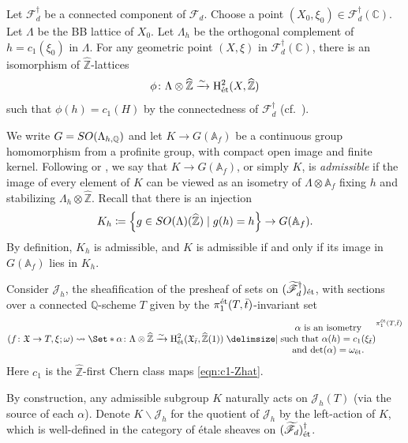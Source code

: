\documentclass[11pt,reqno,oneside]{amsart}
\numberwithin{equation}{section}
\theoremstyle{definition}
\newcommand{\SO}{{\rm SO}}
\DeclareMathOperator{\et}{\Acute{e}t}
\newcommand{\scF}{\mathscr{F}}
\newcommand\rH{\mathrm{H}}
\newcommand{\CC}{\mathbb{C}}
\newcommand{\QQ}{\mathbb{Q}}
\newcommand{\ZZ}{\mathbb{Z}}
\newcommand{\fX}{\mathfrak{X}}
\begin{document}
Let $\scF_{d}^{\dag}$ be a connected component of $\scF_d$. Choose a point $(X_0,\xi_0) \in \scF_d^{\dag}(\CC)$.
Let $\Lambda$ be the BB lattice of $X_0$. Let $\Lambda_{h}$ be the orthogonal complement of $h= c_1(\xi_0)$ in $\Lambda$.
For any geometric point $(X,\xi)$ in $\scF_{d}^{\dag}(\CC)$, there is an isomorphism of $\widehat{\ZZ}$-lattices
\[
\phi \colon \Lambda \otimes \widehat{\ZZ} \xrightarrow{\sim} \rH^2_{\et}(X, \widehat{\ZZ})  
\]
such that $\phi(h) = c_1(H)$ by the connectedness of $\scF_d^\dag$ (cf.~\cite[Lemma 4.5.1]{BindtThesis}). 


We write $G=\SO(\Lambda_{h,{\QQ}})$ and let $K \to  G(\mathbb{A}_f)$ be a continuous group homomorphism from a profinite group, with compact open image and finite kernel. Following \cite{Ri06} or \cite{BL19}, we say that $K\to  G(\mathbb{A}_f)$, or simply $K$, is {\it admissible} if the image of every element of $K$ can be viewed as an isometry of $\Lambda \otimes \mathbb{A}_f$ fixing $h$ and  stabilizing $\Lambda_h \otimes \widehat{\ZZ}$.
Recall that there is an injection
\begin{equation}
K_h \coloneqq \left\{g\in \SO(\Lambda)(\widehat{\ZZ}) \; | \; g(h)=h \right\}\rightarrow G(\mathbb{A}_f).
\end{equation} 
By definition, $K_h$ is admissible, and $K$ is admissible if and only if its image in $G(\mathbb{A}_f)$ lies in $K_h$.



Consider $\mathcal{J}_h$, the sheafification of the
presheaf of sets  on $(\widetilde{\scF}^{\dag}_d)_{\et}$, with sections over a connected $\QQ$-scheme $T$ given by the $\pi^{\et}_1(T,\bar{t})$-invariant set
\begin{equation}
(f \colon \fX \to T, \xi;\omega) \rightsquigarrow \Set*{\alpha \colon \Lambda\otimes\widehat{ \ZZ} \xrightarrow{\sim} \rH^2_{\et}(\fX_{\bar{t}},\widehat{\ZZ}(1)) \given
\begin{matrix}
\text{$\alpha$ is an isometry}\\
\text{such that $\alpha(h)=c_1(\xi_{\bar{t}})$}\\
\text{and $\det(\alpha) = \omega_{\et}$}.
\end{matrix}
}^{\pi_1^{\et}(T, \bar{t})}
\end{equation}
Here $c_1$ is the $\widehat{\ZZ}$-first Chern class maps \eqref{eqn:c1-Zhat}.

By construction, any admissible subgroup $K$ naturally acts on $\mathcal{J}_h(T)$ (via the source of each $\alpha$). Denote $K \backslash\mathcal{J}_h$ for the quotient of $\mathcal{J}_h$ by the left-action of $K$, which is well-defined in the category of \'etale sheaves on $(\widetilde{\scF}_d)_{\et}^{\dag}$.
\end{document}

